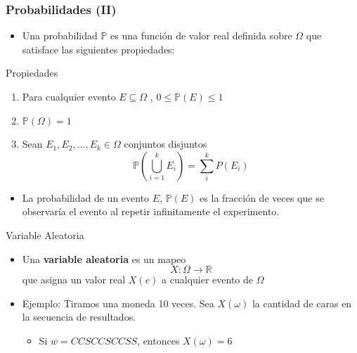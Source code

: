 \documentclass[handout]{beamer}
\begin{document}
\begin{frame}\frametitle{Probabilidades (II)}
\begin{scriptsize}
\begin{itemize}
 \item Una probabilidad $\mathbb{P}$ es una función de valor real definida sobre $\Omega$ que satisface las siguientes propiedades:
\end{itemize}

\begin{block}{Propiedades}
\begin{enumerate}
 \item Para cualquier evento $E \subseteq \Omega$ , $0 \leq \mathbb{P}(E) \leq 1$
 \item $\mathbb{P}(\Omega)=1$
 \item Sean $E_{1},E_{2},\dots,E_{k} \in \Omega$ conjuntos disjuntos 
 \begin{displaymath}
  \mathbb{P}(\bigcup_{i=1}^{k}E_{i}) = \sum_{i}^{k}P(E_{i})
 \end{displaymath}
\end{enumerate}
\end{block}
\begin{itemize}
 \item La probabilidad de un evento $E$, $\mathbb{P}(E)$ es la fracción de veces que se observaría el evento al repetir infinitamente el experimento.
\end{itemize}


\end{scriptsize} 

\end{frame}


\begin{frame}{Variable Aleatoria}
\scriptsize{

\begin{itemize}
 \item Una \textbf{variable aleatoria} es un mapeo 
\begin{displaymath}
 X: \Omega \rightarrow \mathbb{R}
\end{displaymath}
que asigna un valor real $X(e)$ a cualquier evento de $\Omega$


\item Ejemplo: Tiramos una moneda 10 veces. Sea $X(\omega)$ la cantidad de caras en la secuencia de resultados.
\begin{itemize}
 \item Si $w=CCSCCSCCSS$, entonces $X(\omega)=6$ 
\end{itemize}


\end{itemize}

}

\end{frame}
\end{document}
